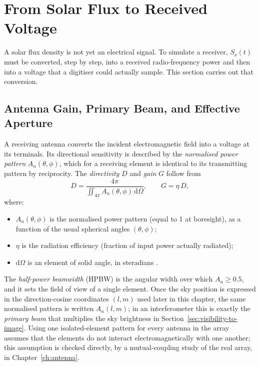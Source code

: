 \section{From Solar Flux to Received Voltage}
\label{sec:flux-to-voltage}
A solar flux density is not yet an electrical signal. To simulate a
receiver, $S_\nu(t)$ must be converted, step by step, into a received
radio-frequency power and then into a voltage that a digitiser could
actually sample. This section carries out that conversion.

\subsection{Antenna Gain, Primary Beam, and Effective Aperture}
\label{subsec:antenna-gain-beam}
A receiving antenna converts the incident electromagnetic field into a
voltage at its terminals. Its directional sensitivity is described by the
\emph{normalised power pattern} $A_n(\theta,\phi)$, which for a receiving
element is identical to its transmitting pattern by reciprocity. The
\emph{directivity} $D$ and \emph{gain} $G$ follow from
\begin{equation}
  D = \frac{4\pi}{\displaystyle\iint_{4\pi} A_n(\theta,\phi)\,\mathrm{d}\Omega},
  \qquad G = \eta\,D,
  \label{eq:directivity}
\end{equation}
where:
\begin{itemize}[leftmargin=1.5em,itemsep=1pt,topsep=2pt]
  \item $A_n(\theta,\phi)$ is the normalised power pattern (equal to 1 at
        boresight), as a function of the usual spherical angles
        $(\theta,\phi)$;
  \item $\eta$ is the radiation efficiency (fraction of input power actually
        radiated);
  \item $\mathrm{d}\Omega$ is an element of solid angle, in steradians \citep{balanis2016,stutzman2013}.
\end{itemize}
The \emph{half-power beamwidth} (HPBW) is the angular width over which
$A_n \geq 0.5$, and it sets the field of view of a single element. Once the
sky position is expressed in the direction-cosine coordinates $(l,m)$ used
later in this chapter, the same normalised pattern is written $A_n(l,m)$; in
an interferometer this is exactly the \emph{primary beam} that multiplies the
sky brightness in Section~\ref{sec:visibility-to-image}. Using one
isolated-element pattern for every antenna in the array assumes that the
elements do not interact electromagnetically with one another; this
assumption is checked directly, by a mutual-coupling study of the real array,
in Chapter~\ref{ch:antenna}.

